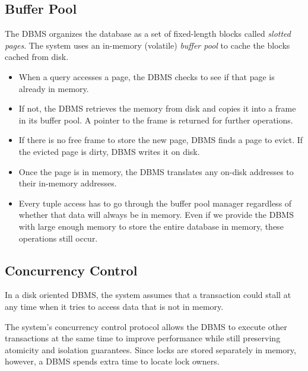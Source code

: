 \documentclass[11pt]{article}
\begin{document}
\subsection*{Buffer Pool}
The DBMS organizes the database as a set of fixed-length blocks called \textit{slotted pages}.
The system uses an in-memory (volatile) \textit{buffer pool} to cache the blocks cached from disk.

\begin{itemize}
    \item
    When a query accesses a page, the DBMS checks to see if that page is already in memory.
        
    \item
    If not, the DBMS retrieves the memory from disk and copies it into a frame in its 
    buffer pool. A pointer to the frame is returned for further operations.
    
    \item If there is no free frame to store the new page, DBMS finds a page to evict.
    If the evicted page is dirty, DBMS writes it on disk.
        
    \item
    Once the page is in memory, the DBMS translates any on-disk addresses to their 
    in-memory addresses.
        
    \item
    Every tuple access has to go through the buffer pool manager regardless of whether 
    that data will always be in memory. Even if we provide the DBMS with large enough
    memory to store the entire database in memory, these operations still occur.
\end{itemize}
    
\subsection*{Concurrency Control}
In a disk oriented DBMS, the system assumes that a transaction could stall at any time when 
it tries to access data that is not in memory.
        
The system's concurrency control protocol allows the DBMS to execute other transactions at 
the same time to improve performance while still preserving atomicity and isolation 
guarantees. Since locks are stored separately in memory, however, a DBMS spends extra time to
locate lock owners.
        
\end{document}
